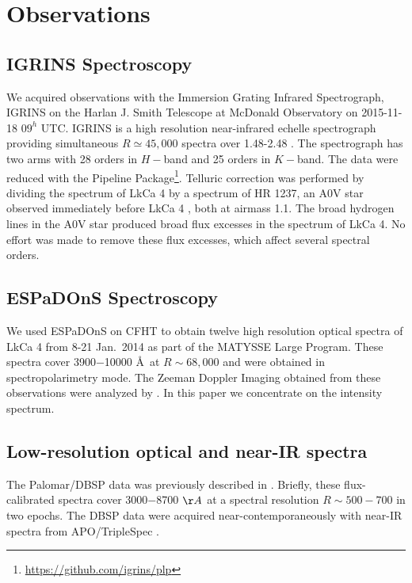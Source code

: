\documentclass[twocolumn]{emulateapj}%
\newcommand{\name}{LkCa 4 }
\begin{document}
\section{Observations}\label{sec:obs} 

\subsection{IGRINS Spectroscopy}\label{sec:igrins} 
We acquired observations with the Immersion Grating Infrared Spectrograph, IGRINS \citep{gully12,park14} on the Harlan J. Smith Telescope at McDonald Observatory on 2015-11-18 $09^h$ UTC.  IGRINS is a high resolution near-infrared echelle spectrograph providing simultaneous $R\simeq45,000$ spectra over 1.48-2.48 \um.  The spectrograph has two arms with 28 orders in $H-$band and 25 orders in $K-$band.  The data were reduced with the Pipeline Package\footnote{\url{https://github.com/igrins/plp}}.  Telluric correction was performed by dividing the spectrum of \name by a spectrum of HR 1237, an A0V star observed immediately before \name, both at airmass 1.1.  The broad hydrogen lines in the A0V star produced broad flux excesses in the spectrum of LkCa 4.  No effort was made to remove these flux excesses, which affect several spectral orders. 


\subsection{ESPaDOnS Spectroscopy}
We used ESPaDOnS on CFHT to obtain twelve high resolution optical spectra of \name from 8-21 Jan.~2014 as part of the MATYSSE Large Program.  These spectra cover 3900$-$10000 \AA\ at $R\sim68,000$ and were obtained in spectropolarimetry mode.  The Zeeman Doppler Imaging obtained from these observations were analyzed by \citet{donati14}.  In this paper we concentrate on the intensity spectrum.  


\subsection{Low-resolution optical and near-IR spectra}

The Palomar/DBSP \citep{oke82} data was previously described in \citet{herczeg14}.  Briefly, these flux-calibrated spectra cover 3000$-$8700 $\AA$ at a spectral resolution $R\sim500-700$ in two epochs.  The DBSP data were acquired near-contemporaneously with near-IR spectra from APO/TripleSpec \citep{wilson04}. 
\end{document}
